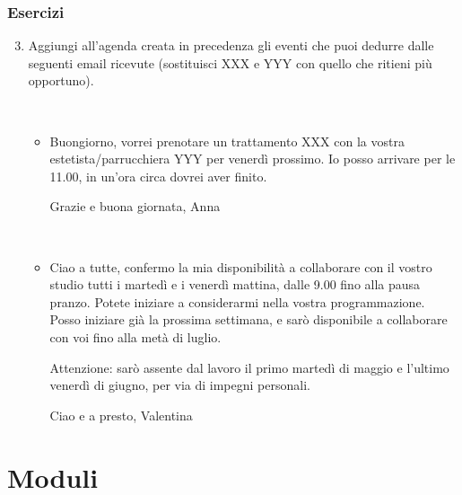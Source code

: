 \documentclass[]{beamer}
\begin{document}
\begin{frame}
  \frametitle{Esercizi}
  \begin{enumerate}\setcounter{enumi}{2}
    \item Aggiungi all'agenda creata in precedenza gli eventi che puoi dedurre dalle seguenti email ricevute (sostituisci XXX e YYY con quello che ritieni più opportuno).
    
    ~

    \begin{itemize}
      \item Buongiorno, vorrei prenotare un trattamento XXX con la vostra estetista/parrucchiera YYY per venerdì prossimo. Io posso arrivare per le 11.00, in un'ora circa dovrei aver finito.

      Grazie e buona giornata, Anna

      ~
      \item Ciao a tutte, confermo la mia disponibilità a collaborare con il vostro studio tutti i martedì e i venerdì mattina, dalle 9.00 fino alla pausa pranzo. Potete iniziare a considerarmi nella vostra programmazione. Posso iniziare già la prossima settimana, e sarò disponibile a collaborare con voi fino alla metà di luglio.

      Attenzione: sarò assente dal lavoro il primo martedì di maggio e l'ultimo venerdì di giugno, per via di impegni personali.

      Ciao e a presto, Valentina
    \end{itemize}
  \end{enumerate}
\end{frame}



\section{Moduli}
\end{document}
